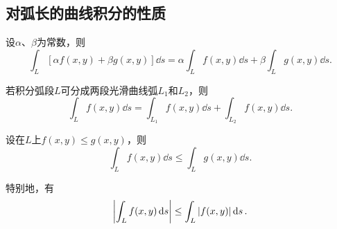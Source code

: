 \subsection{对弧长的曲线积分的性质}
\begin{property}\label{theorem:线积分与面积分.第一类曲线积分性质1}
设\(\alpha\)、\(\beta\)为常数，则\[
\int_L [\alpha f(x,y) + \beta g(x,y)] \dd{s}
= \alpha \int_L f(x,y) \dd{s}
+ \beta \int_L g(x,y) \dd{s}.
\]
\end{property}

\begin{property}\label{theorem:线积分与面积分.第一类曲线积分性质2}
若积分弧段\(L\)可分成两段光滑曲线弧\(L_1\)和\(L_2\)，则\[
\int_L f(x,y) \dd{s}
=\int_{L_1} f(x,y) \dd{s}
+\int_{L_2} f(x,y) \dd{s}.
\]
\end{property}

\begin{property}\label{theorem:线积分与面积分.第一类曲线积分性质3}
设在\(L\)上\(f(x,y) \leq g(x,y)\)，则\[
\int_L f(x,y) \dd{s}
\leq
\int_L g(x,y) \dd{s}.
\]

特别地，有\[
\abs{\int_L f(x,y) \dd{s}} \leq \int_L \abs{f(x,y)} \dd{s}.
\]
\end{property}

